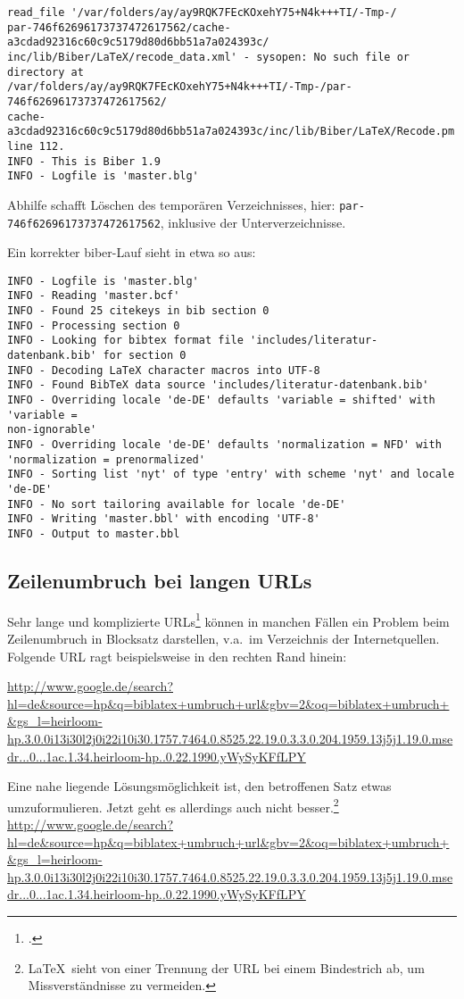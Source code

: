 {\small
\begin{verbatim}
read_file '/var/folders/ay/ay9RQK7FEcKOxehY75+N4k+++TI/-Tmp-/
par-746f62696173737472617562/cache-a3cdad92316c60c9c5179d80d6bb51a7a024393c/
inc/lib/Biber/LaTeX/recode_data.xml' - sysopen: No such file or directory at 
/var/folders/ay/ay9RQK7FEcKOxehY75+N4k+++TI/-Tmp-/par-746f62696173737472617562/
cache-a3cdad92316c60c9c5179d80d6bb51a7a024393c/inc/lib/Biber/LaTeX/Recode.pm 
line 112.
INFO - This is Biber 1.9
INFO - Logfile is 'master.blg'
\end{verbatim}
}

Abhilfe schafft Löschen des temporären Verzeichnisses, hier: \verb|par-746f62696173737472617562|, inklusive der Unterverzeichnisse.

Ein korrekter biber-Lauf sieht in etwa so aus:
{\small
\begin{verbatim}
INFO - Logfile is 'master.blg'
INFO - Reading 'master.bcf'
INFO - Found 25 citekeys in bib section 0
INFO - Processing section 0
INFO - Looking for bibtex format file 'includes/literatur-datenbank.bib' for section 0
INFO - Decoding LaTeX character macros into UTF-8
INFO - Found BibTeX data source 'includes/literatur-datenbank.bib'
INFO - Overriding locale 'de-DE' defaults 'variable = shifted' with 'variable = 
non-ignorable'
INFO - Overriding locale 'de-DE' defaults 'normalization = NFD' with 
'normalization = prenormalized'
INFO - Sorting list 'nyt' of type 'entry' with scheme 'nyt' and locale 'de-DE'
INFO - No sort tailoring available for locale 'de-DE'
INFO - Writing 'master.bbl' with encoding 'UTF-8'
INFO - Output to master.bbl 
\end{verbatim}
}

\subsection{Zeilenumbruch bei langen URLs}
Sehr lange und komplizierte URLs\footcite{langeURL} können in manchen Fällen ein Problem beim Zeilenumbruch in Blocksatz darstellen, v.a.\ im Verzeichnis der Internetquellen. Folgende URL ragt beispielsweise in den rechten Rand hinein: 

\url{http://www.google.de/search?hl=de&source=hp&q=biblatex+umbruch+url&gbv=2&oq=biblatex+umbruch+&gs_l=heirloom-hp.3.0.0i13i30l2j0i22i10i30.1757.7464.0.8525.22.19.0.3.3.0.204.1959.13j5j1.19.0.msedr...0...1ac.1.34.heirloom-hp..0.22.1990.yWySyKFfLPY}

Eine nahe liegende Lösungsmöglichkeit ist, den betroffenen Satz etwas umzuformulieren.
Jetzt geht es allerdings auch nicht besser.\footnote{%
\LaTeX\ sieht von einer Trennung der URL bei einem Bindestrich ab, um Missverständnisse zu vermeiden.
}
\url{http://www.google.de/search?hl=de&source=hp&q=biblatex+umbruch+url&gbv=2&oq=biblatex+umbruch+&gs_l=heirloom-hp.3.0.0i13i30l2j0i22i10i30.1757.7464.0.8525.22.19.0.3.3.0.204.1959.13j5j1.19.0.msedr...0...1ac.1.34.heirloom-hp..0.22.1990.yWySyKFfLPY}

